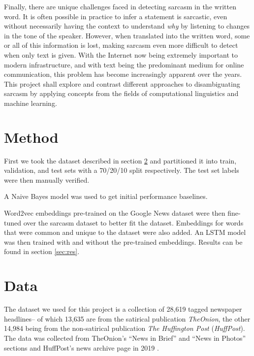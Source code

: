 \documentclass[11pt]{article}
\begin{document}
Finally, there are unique challenges faced in detecting sarcasm in the written
word. It is often possible in practice to infer a statement is sarcastic, even
without necessarily having the context to understand \textit{why} by listening
to changes in the tone of the speaker. However, when translated into the
written word, some or all of this information is lost, making sarcasm even more
difficult to detect when only text is given. With the Internet now being
extremely important to modern infrastructure, and with text being the
predominant medium for online communication, this problem has become
increasingly apparent over the years. This project shall explore and contrast
different approaches to disambiguating sarcasm by applying concepts from the
fields of computational linguistics and machine learning.

\section{Method}

First we took the dataset described in section \ref{sec:data}
and partitioned it into train, validation, and test sets with a 70/20/10 split respectively.
The test set labels were then manually verified.


A Naive Bayes model was used to get initial performance baselines.

Word2vec embeddings pre-trained on the Google News dataset
were then fine-tuned over the sarcasm dataset to better fit the dataset. \cite{google-word2vec}
Embeddings for words that were common and unique to the dataset were also added.
An LSTM model was then trained with and without the pre-trained embeddings.
Results can be found in section \ref{sec:res}.

\section{Data}\label{sec:data}

The dataset we used for this project is a collection of 28,619 tagged
newspaper headlines-- of which 13,635 are from the satirical publication
\textit{TheOnion}, the other 14,984 being from the non-satirical publication
\textit{The Huffington Post} (\textit{HuffPost}). The data was collected from
TheOnion's ``News in Brief'' and ``News in Photos'' sections and HuffPost's
news archive page in 2019
\cite{misra2023Sarcasm}.
\end{document}
